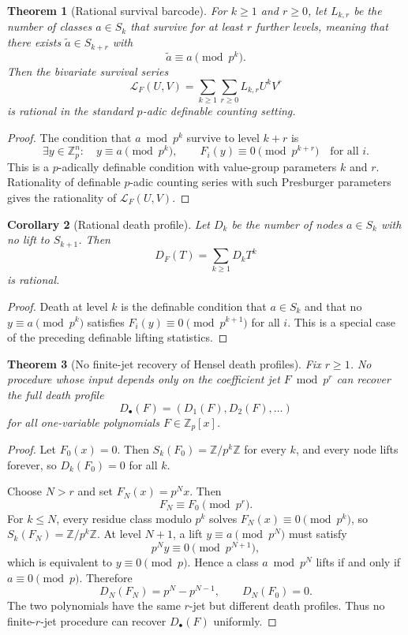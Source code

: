 \documentclass[11pt]{article}
\newtheorem{theorem}{Theorem}[section]
\newtheorem{corollary}[theorem]{Corollary}
\begin{document}
\begin{theorem}[Rational survival barcode]
For \(k\geq1\) and \(r\geq0\), let \(L_{k,r}\) be the number of classes \(a\in S_k\) that survive for at least \(r\) further levels, meaning that there exists \(\widetilde a\in S_{k+r}\) with
\[
\widetilde a\equiv a\pmod {p^k}.
\]
Then the bivariate survival series
\[
\mathcal L_F(U,V)=\sum_{k\geq1}\sum_{r\geq0}L_{k,r}U^kV^r
\]
is rational in the standard \(p\)-adic definable counting setting.
\end{theorem}

\begin{proof}
The condition that \(a\bmod p^k\) survive to level \(k+r\) is
\[
\exists y\in\mathbb Z_p^n:
\quad
y\equiv a\pmod {p^k},
\qquad
F_i(y)\equiv0\pmod {p^{k+r}}
\quad\text{for all }i.
\]
This is a \(p\)-adically definable condition with value-group parameters \(k\) and \(r\). Rationality of definable \(p\)-adic counting series with such Presburger parameters gives the rationality of \(\mathcal L_F(U,V)\).
\end{proof}

\begin{corollary}[Rational death profile]
Let \(D_k\) be the number of nodes \(a\in S_k\) with no lift to \(S_{k+1}\). Then
\[
D_F(T)=\sum_{k\geq1}D_kT^k
\]
is rational.
\end{corollary}

\begin{proof}
Death at level \(k\) is the definable condition that \(a\in S_k\) and that no \(y\equiv a\pmod {p^k}\) satisfies \(F_i(y)\equiv0\pmod {p^{k+1}}\) for all \(i\). This is a special case of the preceding definable lifting statistics.
\end{proof}

\begin{theorem}[No finite-jet recovery of Hensel death profiles]
Fix \(r\geq1\). No procedure whose input depends only on the coefficient jet \(F\bmod p^r\) can recover the full death profile
\[
D_\bullet(F)=(D_1(F),D_2(F),\ldots)
\]
for all one-variable polynomials \(F\in\mathbb Z_p[x]\).
\end{theorem}

\begin{proof}
Let \(F_0(x)=0\). Then \(S_k(F_0)=\mathbb Z/p^k\mathbb Z\) for every \(k\), and every node lifts forever, so \(D_k(F_0)=0\) for all \(k\).

Choose \(N>r\) and set \(F_N(x)=p^Nx\). Then
\[
F_N\equiv F_0\pmod {p^r}.
\]
For \(k\leq N\), every residue class modulo \(p^k\) solves \(F_N(x)\equiv0\pmod {p^k}\), so \(S_k(F_N)=\mathbb Z/p^k\mathbb Z\). At level \(N+1\), a lift \(y\equiv a\pmod {p^N}\) must satisfy
\[
p^Ny\equiv0\pmod {p^{N+1}},
\]
which is equivalent to \(y\equiv0\pmod p\). Hence a class \(a\bmod p^N\) lifts if and only if \(a\equiv0\pmod p\). Therefore
\[
D_N(F_N)=p^N-p^{N-1},
\qquad
D_N(F_0)=0.
\]
The two polynomials have the same \(r\)-jet but different death profiles. Thus no finite-\(r\)-jet procedure can recover \(D_\bullet(F)\) uniformly.
\end{proof}
\end{document}
